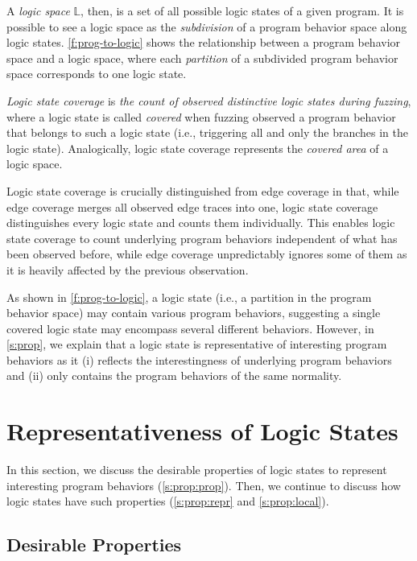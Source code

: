 \documentclass[letterpaper,twocolumn,10pt]{article}
\begin{document}
A \emph{logic space} $\mathbb{L}$, then, is a set of all possible logic states
of a given program. 
%
It is possible to see a logic space as the \emph{subdivision} of a program
behavior space along logic states. \autoref{f:prog-to-logic} shows the
relationship between a program behavior space and a logic space, where each
\emph{partition} of a subdivided program behavior space corresponds to one logic
state. 


%
\emph{Logic state coverage} is \emph{the count of observed distinctive logic
states during fuzzing}, where a logic state is called \emph{covered} when
fuzzing observed a program behavior that belongs to such a logic state (i.e.,
triggering all and only the branches in the logic state). 
%
Analogically, logic state coverage represents the \emph{covered area} of a logic
space.

Logic state coverage is crucially distinguished from edge coverage in that, 
while edge coverage merges all observed edge traces into one, logic state
coverage distinguishes every logic state and counts them individually. This
enables logic state coverage to count underlying program behaviors independent 
of what has been observed before, while edge coverage unpredictably ignores some
of them as it is heavily affected by the previous observation.

As shown in \autoref{f:prog-to-logic}, a logic state (i.e., a partition in the
program behavior space) may contain various program behaviors, suggesting a
single covered logic state may encompass several different behaviors. However,
in \autoref{s:prop}, we explain that a logic state is representative of
interesting program behaviors as it (i) reflects the interestingness of
underlying program behaviors and (ii) only contains the program behaviors of the
same normality.


\section{Representativeness of Logic States}
\label{s:prop}

In this section, we discuss the desirable properties of logic states to
represent interesting program behaviors (\autoref{s:prop:prop}). Then, we
continue to discuss how logic states have such properties
(\autoref{s:prop:repr} and \ref{s:prop:local}).

\subsection{Desirable Properties}%
\label{s:prop:prop}
\end{document}
